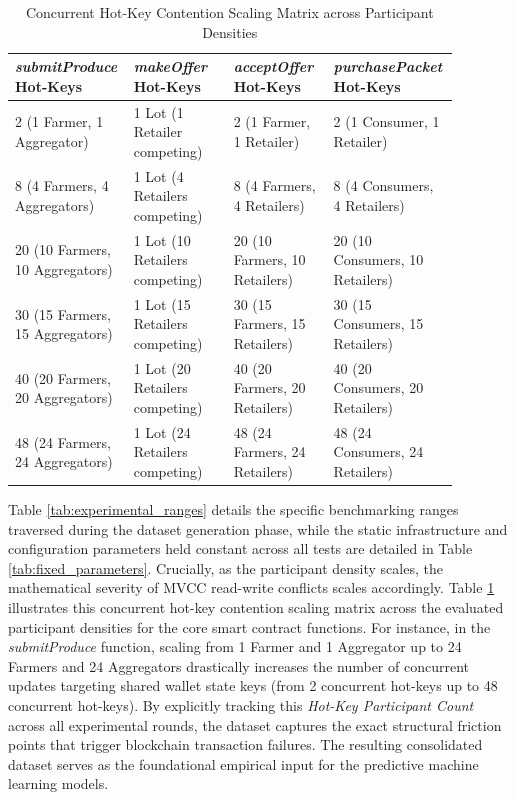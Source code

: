 ﻿\documentclass[12pt]{article}
\begin{document}
\begin{table}[H]
\centering
\caption{Concurrent Hot-Key Contention Scaling Matrix across Participant Densities}
\label{tab:hotkey_scaling}
\begin{tabular}{|p{0.22\linewidth}|p{0.22\linewidth}|p{0.22\linewidth}|p{0.22\linewidth}|}
\hline
\textbf{\textit{submitProduce} Hot-Keys} & \textbf{\textit{makeOffer} Hot-Keys} & \textbf{\textit{acceptOffer} Hot-Keys} & \textbf{\textit{purchasePacket} Hot-Keys} \\
\hline
2 (1 Farmer, 1 Aggregator) & 1 Lot (1 Retailer competing) & 2 (1 Farmer, 1 Retailer) & 2 (1 Consumer, 1 Retailer) \\ \hline
8 (4 Farmers, 4 Aggregators) & 1 Lot (4 Retailers competing) & 8 (4 Farmers, 4 Retailers) & 8 (4 Consumers, 4 Retailers) \\ \hline
20 (10 Farmers, 10 Aggregators) & 1 Lot (10 Retailers competing) & 20 (10 Farmers, 10 Retailers) & 20 (10 Consumers, 10 Retailers) \\ \hline
30 (15 Farmers, 15 Aggregators) & 1 Lot (15 Retailers competing) & 30 (15 Farmers, 15 Retailers) & 30 (15 Consumers, 15 Retailers) \\ \hline
40 (20 Farmers, 20 Aggregators) & 1 Lot (20 Retailers competing) & 40 (20 Farmers, 20 Retailers) & 40 (20 Consumers, 20 Retailers) \\ \hline
48 (24 Farmers, 24 Aggregators)& 1 Lot (24 Retailers competing) & 48 (24 Farmers, 24 Retailers) & 48 (24 Consumers, 24 Retailers) \\
\hline
\end{tabular}
\end{table}

Table \ref{tab:experimental_ranges} details the specific benchmarking ranges traversed during the dataset generation phase, while the static infrastructure and configuration parameters held constant across all tests are detailed in Table \ref{tab:fixed_parameters}. Crucially, as the participant density scales, the mathematical severity of MVCC read-write conflicts scales accordingly. Table \ref{tab:hotkey_scaling} illustrates this concurrent hot-key contention scaling matrix across the evaluated participant densities for the core smart contract functions. For instance, in the \textit{submitProduce} function, scaling from 1 Farmer and 1 Aggregator up to 24 Farmers and 24 Aggregators drastically increases the number of concurrent updates targeting shared wallet state keys (from 2 concurrent hot-keys up to 48 concurrent hot-keys). By explicitly tracking this \textit{Hot-Key Participant Count} across all experimental rounds, the dataset captures the exact structural friction points that trigger blockchain transaction failures. The resulting consolidated dataset serves as the foundational empirical input for the predictive machine learning models.
\end{document}

